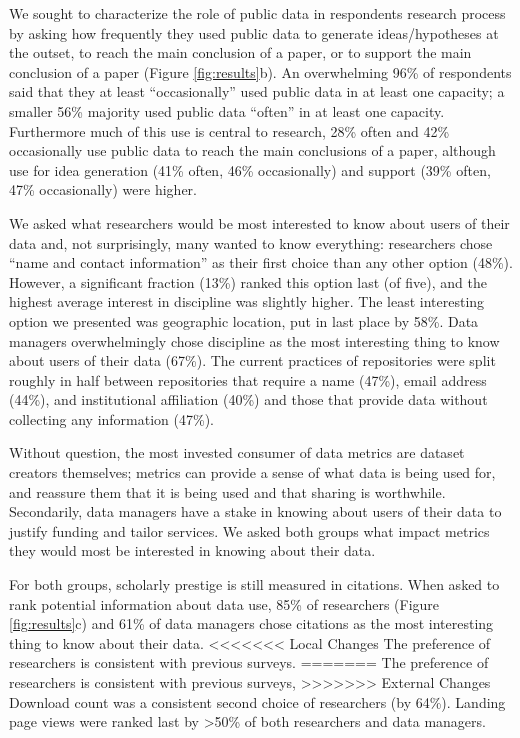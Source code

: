 \documentclass[english]{article}
\begin{document}
We sought to characterize the role of public data in respondents research process by asking how frequently they used public data to generate ideas/hypotheses at the outset, to reach the main conclusion of a paper, or to support the main conclusion of a paper (Figure \ref{fig:results}b).
An overwhelming 96\% of respondents said that they at least ``occasionally'' used public data in at least one capacity; a smaller 56\% majority used public data ``often'' in at least one capacity.
Furthermore much of this use is central to research, 28\% often and 42\% occasionally use public data to reach the main conclusions of a paper, although use for idea generation (41\% often, 46\% occasionally) and support (39\% often, 47\% occasionally) were higher.



We asked what researchers would be most interested to know about users of their data and, not surprisingly, many wanted to know everything: researchers chose ``name and contact information'' as their first choice than any other option (48\%).
However, a significant fraction (13\%) ranked this option last (of five), and the highest average interest in discipline was slightly higher.
The least interesting option we presented was geographic location, put in last place by 58\%.
Data managers overwhelmingly chose discipline as the most interesting thing to know about users of their data (67\%).
The current practices of repositories were split roughly in half between repositories that require a name (47\%), email address (44\%), and institutional affiliation (40\%) and those that provide data without collecting any information (47\%).


Without question, the most invested consumer of data metrics are dataset creators themselves; metrics can provide a sense of what data is being used for, and reassure them that it is being used and that sharing is worthwhile.
Secondarily, data managers have a stake in knowing about users of their data to justify funding and tailor services.
We asked both groups what impact metrics they would most be interested in knowing about their data. 

For both groups, scholarly prestige is still measured in citations.
When asked to rank potential information about data use, 85\% of researchers (Figure \ref{fig:results}c) and 61\% of data managers chose citations as the most interesting thing to know about their data. 
<<<<<<< Local Changes
The preference of researchers is consistent with previous surveys\cite{kratz_researcher_2015}.
=======
The preference of researchers is consistent with previous surveys\cite{@kratz_researcher_2015}, 
>>>>>>> External Changes
Download count was a consistent second choice of researchers (by 64\%). 
Landing page views were ranked last by >50\% of both researchers and data managers.
\end{document}
